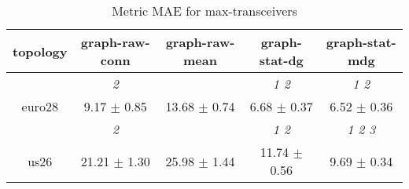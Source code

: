 \begin{table}[h]
\caption{Metric MAE for max-transceivers}

        \centering
        \begin{tabular}{
        ccccc} \toprule 
 topology& graph-raw-conn & graph-raw-mean & graph-stat-dg & graph-stat-mdg \\ \toprule
 & \cellcolor[HTML]{EFEFEF} \textit{ 2 }& \cellcolor[HTML]{EFEFEF} & \cellcolor[HTML]{EFEFEF} \textit{ 1 2 }& \cellcolor[HTML]{EFEFEF} \textit{ 1 2 } \\ 
 {euro28}& \cellcolor[HTML]{EFEFEF} 9.17 $\pm$ 0.85& \cellcolor[HTML]{EFEFEF} 13.68 $\pm$ 0.74& \cellcolor[HTML]{EFEFEF} 6.68 $\pm$ 0.37& \cellcolor[HTML]{EFEFEF} 6.52 $\pm$ 0.36 \\ 
& \cellcolor[HTML]{EFEFEF} \textit{ 2 }& \cellcolor[HTML]{EFEFEF} & \cellcolor[HTML]{EFEFEF} \textit{ 1 2 }& \cellcolor[HTML]{EFEFEF} \textit{ 1 2 3 } \\ 
 {us26}& \cellcolor[HTML]{EFEFEF} 21.21 $\pm$ 1.30& \cellcolor[HTML]{EFEFEF} 25.98 $\pm$ 1.44& \cellcolor[HTML]{EFEFEF} 11.74 $\pm$ 0.56& \cellcolor[HTML]{EFEFEF} 9.69 $\pm$ 0.34 \\ 

        \bottomrule
        \end{tabular}%

        \end{table}
        
